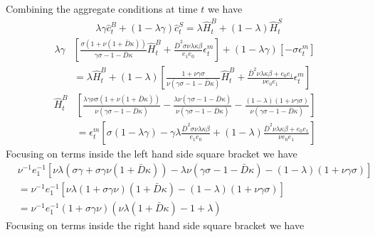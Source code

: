 \documentclass[a4paper,12pt]{article}%
\begin{document}
Combining the aggregate conditions at time $t$ we have 
\begin{align*}
  &\lambda \gamma  \hat{c}^B_{t}+(1-\lambda \gamma) \hat{c}^S_{t}=\lambda  \hat{H}^B_{t}+(1-\lambda) \hat{H}^S_{t}
\end{align*}
\begin{align*}
\lambda \gamma  &\left[ \frac{\sigma(1+\nu(1+{\bar{D}}\kappa))}{\gamma\sigma-1-{\bar{D}}\kappa}\hat{H}^B_{t} + 
 \frac{\bar{D}^2 \sigma\nu \lambda \kappa \beta}{e_1e_0}\epsilon^m_{t} \right]+(1-\lambda \gamma) [-\sigma\epsilon^m_{t}]\\
 &=\lambda  \hat{H}^B_{t}+(1-\lambda) \left[ \frac{1+\nu\gamma\sigma}{\nu(\gamma\sigma-1-{\bar{D}}\kappa)}\hat{H}^B_{t} +  \frac{\bar{D}^2 \nu \lambda \kappa \beta+ e_0e_1}{\nu e_0e_1}\epsilon^m_{t} \right]
\end{align*}
\begin{align*}
\hat{H}^B_{t}  &\left[ \frac{\lambda \gamma \nu\sigma(1+\nu(1+{\bar{D}}\kappa))}{\nu(\gamma\sigma-1-{\bar{D}}\kappa)} -\frac{\lambda\nu(\gamma\sigma-1-{\bar{D}}\kappa)}{\nu(\gamma\sigma-1-{\bar{D}}\kappa)} -  \frac{(1-\lambda)(1+\nu\gamma\sigma)}{\nu(\gamma\sigma-1-{\bar{D}}\kappa)} \right]\\
 &=\epsilon^m_{t} \left[\sigma(1-\lambda \gamma) -  \gamma\lambda\frac{\bar{D}^2 \sigma\nu \lambda \kappa \beta}{e_1e_0} + (1-\lambda)  \frac{\bar{D}^2 \nu \lambda \kappa \beta+ e_0e_1}{\nu e_0e_1} \right]
\end{align*}
Focusing on terms inside the left hand side square bracket we have
\begin{align*}
&\nu^{-1}e_1^{-1}\left[ \nu\lambda(\sigma\gamma + \sigma\gamma\nu(1+{\bar{D}}\kappa)) - \lambda\nu(\gamma\sigma-1-{\bar{D}}\kappa) - (1-\lambda)(1+\nu\gamma\sigma)  \right] \\
&= \nu^{-1}e_1^{-1}\left[	\nu\lambda(1 + \sigma\gamma\nu)(1+{\bar{D}}\kappa) - (1-\lambda)(1+\nu\gamma\sigma) 	\right] \\
&= \nu^{-1}e_1^{-1}(1 + \sigma\gamma\nu)(\nu\lambda(1+{\bar{D}}\kappa) -1+\lambda) 
\end{align*}
Focusing on terms inside the right hand side square bracket we have
\end{document}
